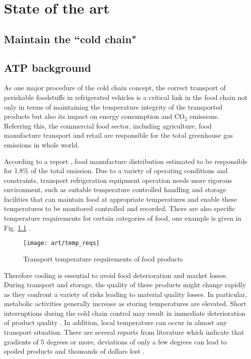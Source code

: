 \chapter{State of the art}     %
\section*{Maintain the ``cold chain"}

\section{ATP background}
As one major procedure of the cold chain concept, the correct transport of perishable foodstuffs in refrigerated vehicles is a critical link in the food chain not only in terms of maintaining the temperature integrity of the transported products but also its impact on energy consumption and CO$_2$ emissions. Referring this, the  commercial food sector, including agriculture, food manufacture transport and retail are responsible for the total greenhouse gas emissions in whole world.

According to a report \citep{watkiss2005validity}, food manufacture distribution estimated to be responsible for 1.8\% of the total emission. Due to a variety of operating conditions and constraints, transport refrigeration equipment operation needs more rigorous environment, such as suitable temperature controlled handling and storage facilities that can maintain food at appropriate temperatures and enable these temperatures to be monitored controlled and recorded. There are also specific temperature requirements for certain categories of food, one example is given in Fig. \ref{tem_reqs} \citep{tem_reqs}.
\begin{figure}[ht]
	\centering
	\texttt{[image: art/temp\_reqs]}
	\label{tem_reqs}
	\caption{Transport temperature requirements of food products}
\end{figure}

Therefore cooling is essential to avoid food deterioration and market losses.  During transport and storage, the quality of these products might change rapidly as they confront a variety of risks leading to material quality losses. In particular, metabolic activities generally increase as storing temperatures are elevated. Short interruptions during the cold chain control may result in immediate deterioration of product quality \citep{Nunes2003Quality}. In addition, local temperature can occur in almost any transport situation. There are several reports from literature which indicate that gradients of 5 degrees or more, deviations of only a few degrees can lead to spoiled products and thousands of dollars lost \citep{Tanner2003Modelling, Nunes2006Brief, Rodriguez-Bermejo2007Thermal}.

